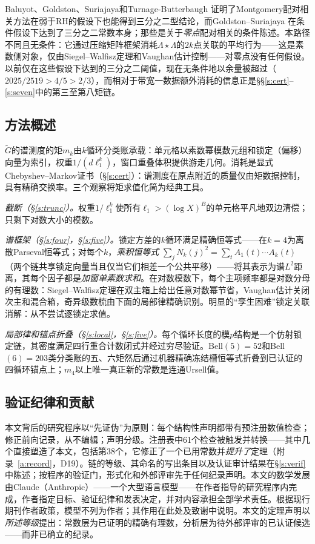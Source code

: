 \documentclass[11pt]{article}
\numberwithin{equation}{section}
\theoremstyle{definition}
\theoremstyle{remark}
\newcommand{\LL}{\Lambda}
\begin{document}
Baluyot、Goldston、Suriajaya和Turnage-Butterbaugh \cite{BGST}证明了Montgomery配对相关方法在弱于RH的假设下也能得到三分之二型结论，而Goldston--Suriajaya \cite{GS}在条件假设下达到了三分之二常数本身；那些是关于\emph{零点}配对相关的条件陈述。本路径不同且无条件：它通过压缩矩阵框架消耗$\LL\star\LL$的$2k$点关联的平均行为——这是素数侧对象，仅由Siegel--Walfisz定理和Vaughan估计控制——对零点没有任何假设。以前仅在这些假设下达到的三分之二阈值，现在无条件地以余量被超过（$2025/2519>4/5>2/3$），而相对于带宽一数据额外消耗的信息正是\S\S\ref{s:cert}--\ref{s:seven}中的第三至第八矩链。

\subsection*{方法概述}

$\widetilde G$的谱测度的矩$m_k$由$k$循环分类账承载：单元格以素数幂模数元组和锁定（偏移）向量为索引，权重$1/(d\ell_1^{k})$，窗口重叠体积提供游走几何。消耗是显式Chebyshev--Markov证书（\S\ref{s:cert}）：谱测度在原点附近的质量仅由矩数据控制，具有精确交换率。三个观察将矩求值化简为经典工具。

\emph{截断（\S\ref{s:trunc}）。}权重$1/\ell_1^{k}$使所有$\ell_1>(\log X)^{B}$的单元格平凡地双边清偿；只剩下对数大小的模数。

\emph{谱框架（\S\ref{s:four}，\S\ref{s:five}）。}锁定方差的$k$循环满足精确恒等式——在$k=4$为离散Parseval恒等式；对每个$k$，\emph{乘积恒等式} $\sum_j N_k(j)^2=\sum_t A_1(t)\cdots A_k(t)$（两个链共享锁定向量当且仅当它们相差一个公共平移）——将其表示为谱$L^2$距离，其每个因子都是\emph{加窗单素数求和}。在对数模数下，每个主项频率都是对数分母的有理数：Siegel--Walfisz定理在双主箱上给出任意对数幂节省，Vaughan估计关闭次主和混合箱，奇异级数梳由下面的局部律精确识别。明显的“孪生困难”锁定关联消解：从不尝试逐锁定求值。

\emph{局部律和锚点折叠（\S\ref{s:local}，\S\ref{s:five}）。}每个循环长度的模$p$结构是一个仿射锁定链，其密度满足四行重合计数闭式并经过穷尽验证。Bell$(5)=52$和Bell$(6)=203$类分类账的五、六矩然后通过机器精确冻结槽恒等式折叠到已认证的四循环锚点上；$m_4$以上唯一真正新的常数是连通Ursell值。

\subsection*{验证纪律和贡献}

本文背后的研究程序以“先证伪”为原则：每个结构性声明都带有预注册数值检查；修正前向记录，从不编辑；声明分级。注册表中61个检查被触发并转换——其中几个直接塑造了本文，包括第38个，它修正了一个已用常数并\emph{提升了}定理（附录~\ref{a:record}，D19）。链的等级、其命名的写出条目以及认证审计结果在\S\ref{s:verif}中陈述；按程序的验证门，形式化和外部评审先于任何纪录声明。本文的数学发展由Claude（Anthropic）——一个大型语言模型——在作者指导的研究程序内完成，作者指定目标、验证纪律和发表决定，并对内容承担全部学术责任。根据现行期刊作者政策，模型不列为作者；其作用在此处及致谢中说明。本文的定理声明以\emph{所述等级}提出：常数层为已证明的精确有理数，分析层为待外部评审的已认证候选——而非已确立的纪录。
\end{document}
